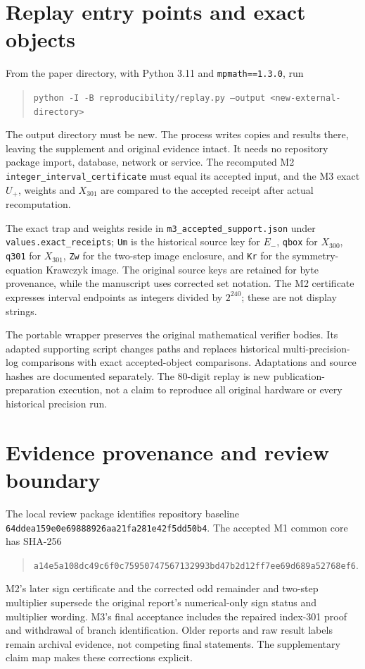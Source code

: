 \documentclass[11pt,a4paper]{article}
\begin{document}
\section{Replay entry points and exact objects}
From the paper directory, with Python 3.11 and \texttt{mpmath==1.3.0}, run
\begin{quote}\small
\texttt{python -I -B reproducibility/replay.py --output <new-external-directory>}
\end{quote}
The output directory must be new. The process writes copies and results there, leaving the supplement and original evidence intact. It needs no repository package import, database, network or service. The recomputed M2 \texttt{integer\_interval\_certificate} must equal its accepted input, and the M3 exact $U_+$, weights and $X_{301}$ are compared to the accepted receipt after actual recomputation.

The exact trap and weights reside in \texttt{m3\_accepted\_support.json} under \texttt{values.exact\_receipts}; \texttt{Um} is the historical source key for $E_-$, \texttt{qbox} for $X_{300}$, \texttt{q301} for $X_{301}$, \texttt{Zw} for the two-step image enclosure, and \texttt{Kr} for the symmetry-equation Krawczyk image. The original source keys are retained for byte provenance, while the manuscript uses corrected set notation. The M2 certificate expresses interval endpoints as integers divided by $2^{240}$; these are not display strings.

The portable wrapper preserves the original mathematical verifier bodies. Its adapted supporting script changes paths and replaces historical multi-precision-log comparisons with exact accepted-object comparisons. Adaptations and source hashes are documented separately. The 80-digit replay is new publication-preparation execution, not a claim to reproduce all original hardware or every historical precision run.

\section{Evidence provenance and review boundary}
The local review package identifies repository baseline \nolinkurl{64ddea159e0e69888926aa21fa281e42f5dd50b4}. The accepted M1 common core has SHA-256
\begin{quote}\small\nolinkurl{a14e5a108dc49c6f0c75950747567132993bd47b2d12ff7ee69d689a52768ef6}.\end{quote}
M2's later sign certificate and the corrected odd remainder and two-step multiplier supersede the original report's numerical-only sign status and multiplier wording. M3's final acceptance includes the repaired index-301 proof and withdrawal of branch identification. Older reports and raw result labels remain archival evidence, not competing final statements. The supplementary claim map makes these corrections explicit.
\end{document}

